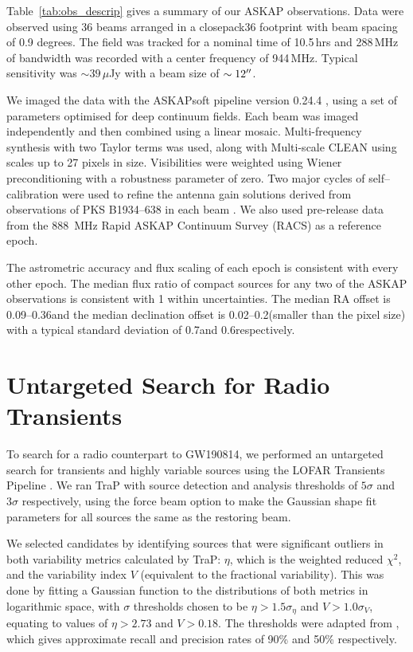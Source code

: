 Table~\ref{tab:obs_descrip} gives a summary of our ASKAP observations. Data were observed using 36 beams arranged in a closepack36 footprint with beam spacing of 0.9 degrees. The field was tracked for a nominal time of 10.5\,hrs and 288\,MHz of bandwidth was recorded with a center frequency of 944\,MHz. Typical sensitivity was $\sim 39\,\mu$Jy with a beam size of $\sim 12\mbox{$^{\prime\prime}$}$.

We imaged the data with the ASKAPsoft pipeline version 0.24.4 \citep{2017ASPC..512..431W}, using a set of parameters optimised for deep continuum fields. Each beam was imaged independently and then combined using a linear mosaic. Multi-frequency synthesis with two Taylor terms was used, along with Multi-scale CLEAN using scales up to 27 pixels in size. Visibilities were weighted using Wiener preconditioning with a robustness parameter of zero.
Two major cycles of self--calibration were used to refine the antenna gain solutions derived from observations of PKS B1934--638 in each beam \citep[see][for a description of the ASKAP beamforming and calibration process]{2016PASA...33...42M}. We also used pre-release data from the 888~MHz Rapid ASKAP Continuum Survey (RACS) as a reference epoch. 


The astrometric accuracy and flux scaling of each epoch is consistent with every other epoch. The median flux ratio of compact sources for any two of the ASKAP observations is consistent with 1 within uncertainties. The median RA offset is 0.09--0.36\arcsec and the median declination offset is 0.02--0.2\arcsec (smaller than the pixel size) with a typical standard deviation of 0.7\arcsec and 0.6\arcsec respectively.




\section{Untargeted Search for Radio Transients}
\label{s_transients}

To search for a radio counterpart to GW190814, we performed an untargeted search for transients and highly variable sources using the LOFAR Transients Pipeline \citep[TraP;][]{2015A&C....11...25S}.
We ran TraP with source detection and analysis thresholds of $5\sigma$ and $3\sigma$ respectively, using the force beam option to make the Gaussian shape fit parameters for all sources the same as the restoring beam. 

We selected candidates by identifying sources that were significant outliers in both variability metrics calculated by TraP: $\eta$, which is the weighted reduced $\chi^{2}$, and the variability index $V$ (equivalent to the fractional variability).
This was done by fitting a Gaussian function to the distributions of both metrics in logarithmic space, with $\sigma$ thresholds chosen to be $\eta > 1.5\sigma_\eta$ and $V > 1.0\sigma_{V}$, equating to values of $\eta > 2.73$ and $V > 0.18$. The thresholds were adapted from \citet{2019A&C....27..111R}, which gives approximate recall and precision rates of 90\% and 50\% respectively. 

